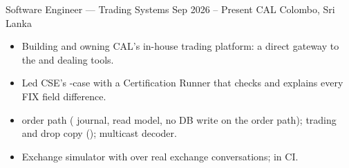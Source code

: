 \CVExperienceEntry
{Software Engineer --- Trading Systems}
{Sep 2026 -- Present}
{CAL}
{Colombo, Sri Lanka}

\begin{itemize}[leftmargin=*, itemsep=0.2em, topsep=0.1em]
  \item Building and owning CAL's in-house trading platform: a direct gateway to the  and dealing tools.
  \item Led CSE's -case  with a Certification Runner that checks and explains every FIX field difference.
  \item {} order path ( journal,  read model, no DB write on the order path);  trading and drop copy ();   multicast decoder.
  \item Exchange simulator with  over  real exchange conversations;  in CI.
\end{itemize}
